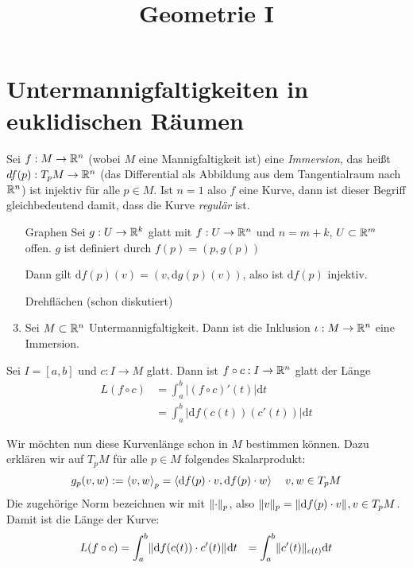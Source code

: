 \documentclass{skript}
\begin{document}
\title{Geometrie I}
\author{}
\maketitle
\tableofcontents
\renewcommand{\d}{\ensuremath{\mathrm d}}

\section{Untermannigfaltigkeiten in euklidischen Räumen}

\begin{dfn}
Sei $f : M \to \mathbb{R}^n$ (wobei $M$ eine Mannigfaltigkeit ist) eine
\emph{Immersion}, das heißt $df(p) : T_p M \to \mathbb{R}^n$ (das Differential als
Abbildung aus dem Tangentialraum nach $\mathbb{R}^n$) ist injektiv für alle $p\in M$.
Ist $n=1$ also $f$ eine Kurve, dann ist dieser Begriff gleichbedeutend damit,
dass die Kurve \emph{regulär} ist.

\begin{bsps}
  \begin{enumerate}
    \item[Graphen] Sei $g: U \to \mathbb{R}^k$ glatt mit $f:U\to\mathbb{R}^n$ und $n = m + k$,
      $U\subset \mathbb{R}^m$ offen. $g$ ist definiert durch $f(p) = (p,g(p))$

      Dann gilt $\d f(p)(v) = (v, \d g(p)(v))$, also ist $\d f(p)$ injektiv.
    \item[Drehflächen] (schon diskutiert)
    \item Sei $M\subset\mathbb{R}^n$ Untermannigfaltigkeit. Dann ist die Inklusion
      $\iota : M \to \mathbb{R}^n$ eine Immersion.
  \end{enumerate}
\end{bsps}
\end{dfn}

Sei $I = [a,b]$ und $c : I \to M$ glatt. Dann ist $f\circ c : I \to \mathbb{R}^n$ glatt
der Länge
\begin{align}
  L(f\circ c) &= \int_a^b\left|(f\circ c)'(t)\right| \d t \\
              &= \int_a^b\left|\d f(c(t))(c'(t))\right| \d t
\end{align}

Wir möchten nun diese Kurvenlänge schon in $M$ bestimmen können. Dazu erklären
wir auf $T_pM$ für alle $p\in M$ folgendes Skalarprodukt:
\begin{align}
  g_p(v, w) := \sprod[p]{v,w} = \sprod{\d f(p)\cdot v, \d f(p) \cdot w}
    \quad v,w \in T_pM
\end{align}
Die zugehörige Norm bezeichnen wir mit $\norm[p]{\cdot}$, also
$\norm[p]{v} = \norm{\d f(p)\cdot v}, v\in T_p M$. Damit ist die
Länge der Kurve:
\begin{align}
  L(f\circ c) &= \int_a^b\norm{\d f(c(t))\cdot c'(t)} \d t
              &= \int_a^b\norm[c(t)]{c'(t)} \d t
\end{align}
\end{document}
